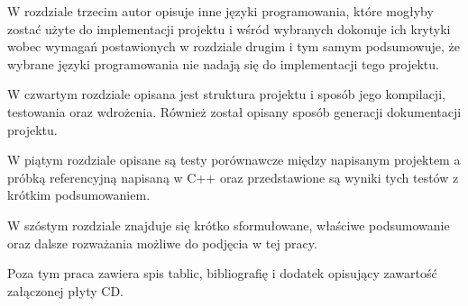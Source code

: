 \documentclass[../../praca.tex]{subfiles}
\begin{document}
W rozdziale trzecim autor opisuje inne języki programowania, które mogłyby
zostać użyte do implementacji projektu i wśród wybranych dokonuje ich krytyki
wobec wymagań postawionych w rozdziale drugim i tym samym podsumowuje, że wybrane
języki programowania nie nadają się do implementacji tego projektu.

W czwartym rozdziale opisana jest struktura projektu i sposób jego kompilacji, testowania
oraz wdrożenia. Również został opisany sposób generacji dokumentacji projektu.

W piątym rozdziale opisane są testy porównawcze między napisanym projektem a próbką 
referencyjną napisaną w C++ oraz przedstawione są wyniki tych testów z krótkim 
podsumowaniem.

W szóstym rozdziale znajduje się krótko sformułowane, właściwe podsumowanie oraz dalsze
rozważania możliwe do podjęcia w tej pracy.

Poza tym praca zawiera spis tablic, bibliografię i dodatek opisujący zawartość załączonej
płyty CD.
\end{document}
